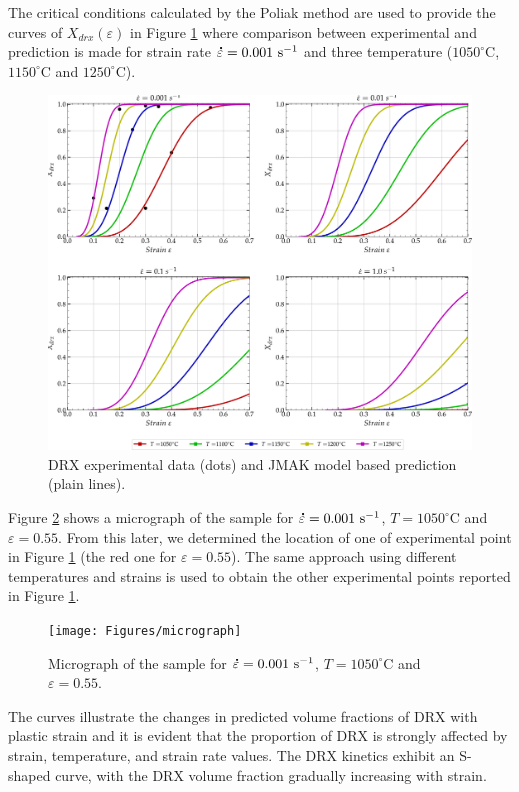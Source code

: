 \documentclass[metals,article,submit,pdftex,moreauthors]{Definitions/mdpi}
\DeclareRobustCommand{\mdot}[1]{\accentset{\mbox{\bfseries .}}{#1}}
\DeclareRobustCommand{\ps}{\text{s}^{-1}}
\begin{document}
The critical conditions calculated by the Poliak method are used to provide the curves of $X_{drx}(\varepsilon)$ in Figure \ref{fig:nDRX} where comparison between experimental and prediction is made for strain rate $\mdot\varepsilon=0.001~\ps$ and three temperature ($1050^\circ$C, $1150^\circ$C and $1250^\circ$C).
\begin{figure}[H]
	\centering
	\includegraphics[width=0.99\columnwidth]{Figures/nDRX1}
	\caption{DRX experimental data (dots) and JMAK model based prediction (plain lines).}
	\label{fig:nDRX}
\end{figure}
Figure \ref{fig:eDRX} shows a micrograph of the sample for $\mdot\varepsilon=0.001~\ps$, $T=1050^\circ$C and $\varepsilon=0.55$. From this later, we determined the location of one of experimental point in Figure \ref{fig:nDRX} (the red one for $\varepsilon=0.55$). The same approach using different temperatures and strains is used to obtain the other experimental points reported in Figure \ref{fig:nDRX}.
\begin{figure}[H]
	\centering
	\texttt{[image: Figures/micrograph]}
	\caption{Micrograph of the sample for $\mdot\varepsilon=0.001~\ps$, $T=1050^\circ$C and $\varepsilon=0.55$.}
	\label{fig:eDRX}
\end{figure}
The curves illustrate the changes in predicted volume fractions of DRX with plastic strain and it is evident that the proportion of DRX is strongly affected by strain, temperature, and strain rate values.
The DRX kinetics exhibit an S-shaped curve, with the DRX volume fraction gradually increasing with strain.
\end{document}
